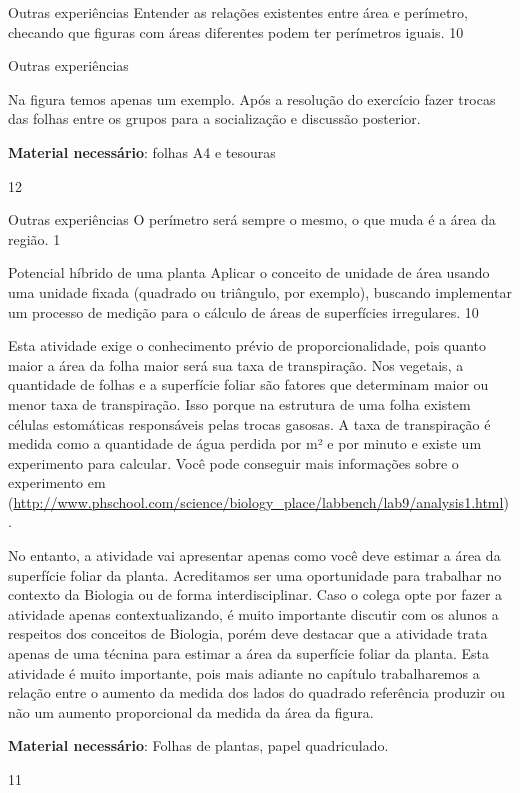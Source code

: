 \begin{objectives}{Outras experiências}
{
  Entender as relações existentes entre área e perímetro, checando que figuras com áreas diferentes podem ter perímetros iguais.
}{1}{0}
\end{objectives}
\begin{sugestions}{Outras experiências}
{
  Na figura temos apenas um exemplo. Após a resolução do exercício fazer trocas das folhas entre os grupos para a socialização e discussão posterior.

  \textbf{Material necessário}: folhas A4 e tesouras
}{1}{2}
\end{sugestions}
\begin{answer}{Outras experiências}
{
  O perímetro será sempre o mesmo, o que muda é a área da região.
}{1}
\end{answer}
\begin{objectives}{Potencial híbrido de uma planta}
{
  Aplicar o conceito de unidade de área usando uma unidade fixada (quadrado ou triângulo, por exemplo), buscando implementar um processo de medição para o cálculo de áreas de superfícies irregulares.
}{1}{0}
\end{objectives}
\begin{sugestions}{}
{
  Esta atividade exige o conhecimento prévio de proporcionalidade, pois quanto maior a área da folha maior será sua taxa de transpiração. Nos vegetais, a quantidade de folhas e a superfície foliar são fatores que determinam maior ou menor taxa de transpiração. Isso porque na estrutura de uma folha existem células estomáticas responsáveis pelas trocas gasosas. A taxa de transpiração é medida como a quantidade de água perdida por m² e por minuto e existe um experimento para calcular. Você pode conseguir mais informações sobre o experimento em (\url{http://www.phschool.com/science/biology_place/labbench/lab9/analysis1.html}). 

  No entanto, a atividade vai apresentar apenas como você deve estimar a área da superfície foliar da planta. Acreditamos ser uma oportunidade para trabalhar no contexto da Biologia ou de forma interdisciplinar. Caso o colega opte por fazer a atividade apenas contextualizando, é muito importante discutir com os alunos a respeitos dos conceitos de Biologia, porém deve destacar que a atividade trata apenas de uma técnina  para estimar a área da superfície foliar da planta. Esta atividade é muito importante, pois mais adiante no capítulo trabalharemos a relação entre o aumento da medida dos lados do quadrado referência produzir ou não um aumento proporcional da medida da área da figura. 

  \textbf{Material necessário}: Folhas de plantas, papel quadriculado.

}{1}{1}
\end{sugestions}
